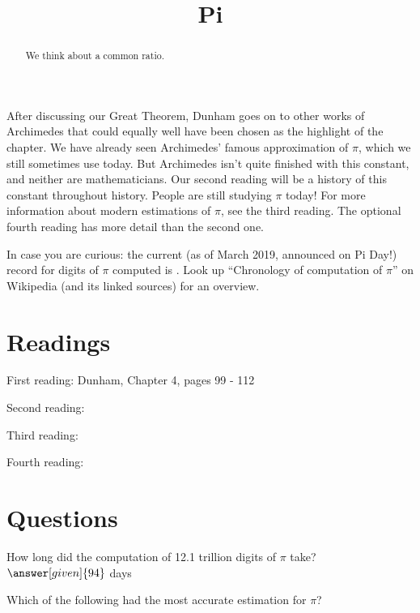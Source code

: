 \documentclass{ximera}
\title{Pi}
\begin{document}
\begin{abstract}
  We think about a common ratio.    
\end{abstract}
\maketitle

After discussing our Great Theorem, Dunham goes on to other works of Archimedes that could equally well have been chosen as the highlight of the chapter.   We have already seen Archimedes' famous approximation of $\pi$, which we still sometimes use today. But Archimedes isn't quite finished with this constant, and neither are mathematicians.  Our second reading will be a history of this constant throughout history.  People are still studying $\pi$ today!  For more information about modern estimations of $\pi$, see the third reading.  The optional fourth reading has more detail than the second one.

In case you are curious: the current (as of March 2019, announced on Pi Day!) record for digits of $\pi$ computed is .  Look up ``Chronology of computation of $\pi$'' on Wikipedia (and its linked sources) for an overview.


\section{Readings}
First reading: Dunham, Chapter 4, pages 99 - 112

Second reading: 

Third reading: 

Fourth reading: 

\section{Questions}

\begin{question}
How long did the computation of 12.1 trillion digits of $\pi$ take? $\answer[given]{94}$ days
\end{question}

\begin{question}
Which of the following had the most accurate estimation for $\pi$?
\begin{multipleChoice}
\end{multipleChoice}
\end{question}
\end{document}
